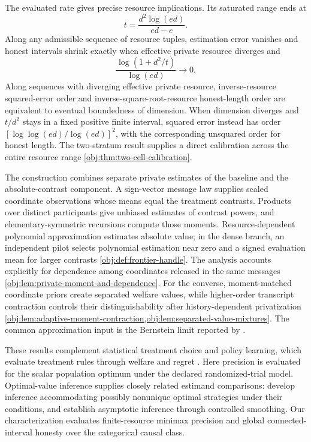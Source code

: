 \documentclass[11pt]{article}
\begin{document}
The evaluated rate gives precise resource implications. Its saturated range ends at
\[
t=\frac{d^2\log(ed)}{ed-e}.
\]
Along any admissible sequence of resource tuples, estimation error vanishes and honest intervals shrink exactly when effective private resource diverges and
\[
\frac{\log(1+d^2/t)}{\log(ed)}\longrightarrow0.
\]
Along sequences with diverging effective private resource, inverse-resource squared-error order and inverse-square-root-resource honest-length order are equivalent to eventual boundedness of dimension. When dimension diverges and \(t/d^2\) stays in a fixed positive finite interval, squared error instead has order \([\log\log(ed)/\log(ed)]^2\), with the corresponding unsquared order for honest length. The two-stratum result supplies a direct calibration across the entire resource range \cref{obj:thm:two-cell-calibration}.

The construction combines separate private estimates of the baseline and the absolute-contrast component. A sign-vector message law supplies scaled coordinate observations whose means equal the treatment contrasts. Products over distinct participants give unbiased estimates of contrast powers, and elementary-symmetric recursions compute those moments. Resource-dependent polynomial approximation estimates absolute value; in the dense branch, an independent pilot selects polynomial estimation near zero and a signed evaluation mean for larger contrasts \cref{obj:def:frontier-handle}. The analysis accounts explicitly for dependence among coordinates released in the same messages \cref{obj:lem:private-moment-and-dependence}. For the converse, moment-matched coordinate priors create separated welfare values, while higher-order transcript contraction controls their distinguishability after history-dependent privatization \cref{obj:lem:adaptive-moment-contraction,obj:lem:separated-value-mixtures}. The common approximation input is the Bernstein limit reported by \citet[Section~3.1, p.~8]{CaiLow2011Nonsmooth}.

These results complement statistical treatment choice and policy learning, which evaluate treatment rules through welfare and regret \citep{Manski2004,Kitagawa2018,Athey2021}. Here precision is evaluated for the scalar population optimum under the declared randomized-trial model. Optimal-value inference supplies closely related estimand comparisons: \citet{LuedtkeVanDerLaan2016OptimalValue} develop inference accommodating possibly nonunique optimal strategies under their conditions, and \citet[Theorem~3.3]{WhitehouseChenAusternSyrgkanis2026Softmax} establish asymptotic inference through controlled smoothing. Our characterization evaluates finite-resource minimax precision and global connected-interval honesty over the categorical causal class.
\end{document}
